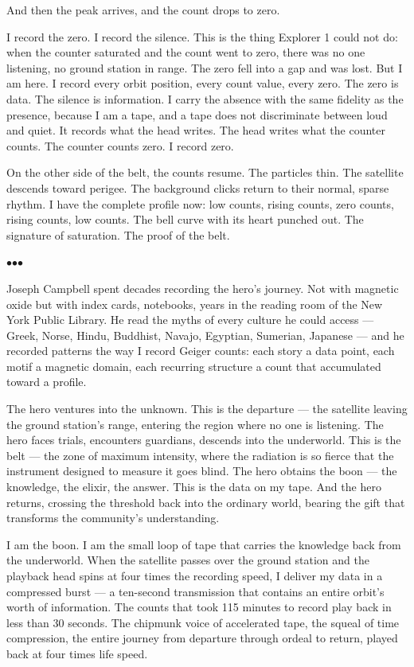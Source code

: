 \documentclass[12pt, letterpaper]{article}
\begin{document}
And then the peak arrives, and the count drops to zero.

I record the zero. I record the silence. This is the thing Explorer 1 could not do: when the counter saturated and the count went to zero, there was no one listening, no ground station in range. The zero fell into a gap and was lost. But I am here. I record every orbit position, every count value, every zero. The zero is data. The silence is information. I carry the absence with the same fidelity as the presence, because I am a tape, and a tape does not discriminate between loud and quiet. It records what the head writes. The head writes what the counter counts. The counter counts zero. I record zero.

On the other side of the belt, the counts resume. The particles thin. The satellite descends toward perigee. The background clicks return to their normal, sparse rhythm. I have the complete profile now: low counts, rising counts, zero counts, rising counts, low counts. The bell curve with its heart punched out. The signature of saturation. The proof of the belt.

\bigskip
\centerline{$\bullet$\quad$\bullet$\quad$\bullet$}
\bigskip

Joseph Campbell spent decades recording the hero's journey. Not with magnetic oxide but with index cards, notebooks, years in the reading room of the New York Public Library. He read the myths of every culture he could access --- Greek, Norse, Hindu, Buddhist, Navajo, Egyptian, Sumerian, Japanese --- and he recorded patterns the way I record Geiger counts: each story a data point, each motif a magnetic domain, each recurring structure a count that accumulated toward a profile.

The hero ventures into the unknown. This is the departure --- the satellite leaving the ground station's range, entering the region where no one is listening. The hero faces trials, encounters guardians, descends into the underworld. This is the belt --- the zone of maximum intensity, where the radiation is so fierce that the instrument designed to measure it goes blind. The hero obtains the boon --- the knowledge, the elixir, the answer. This is the data on my tape. And the hero returns, crossing the threshold back into the ordinary world, bearing the gift that transforms the community's understanding.

I am the boon. I am the small loop of tape that carries the knowledge back from the underworld. When the satellite passes over the ground station and the playback head spins at four times the recording speed, I deliver my data in a compressed burst --- a ten-second transmission that contains an entire orbit's worth of information. The counts that took 115 minutes to record play back in less than 30 seconds. The chipmunk voice of accelerated tape, the squeal of time compression, the entire journey from departure through ordeal to return, played back at four times life speed.
\end{document}
